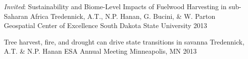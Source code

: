 \begin{pubentries}
\pubentry
    {\emph{Invited}: Sustainability and Biome-Level Impacts of Fuelwood Harvesting in sub-Saharan Africa} %
    {Tredennick, A.T., N.P. Hanan, G. Bucini, \& W. Parton} %
    {Geospatial Center of Excellence} %
    {South Dakota State University} %
    {2013} %

\pubentry
    {Tree harvest, fire, and drought can drive state transitions in savanna} %
    {Tredennick, A.T. \& N.P. Hanan} %
    {ESA Annual Meeting} %
    {Minneapolis, MN} %
    {2013} %




\end{pubentries}
